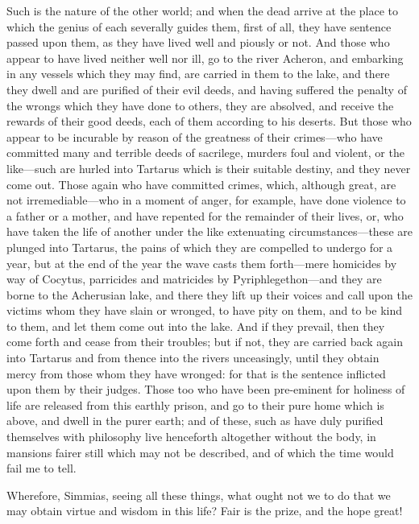 \documentclass[11pt,letter]{article}
\begin{document}
\par  Such is the nature of the other world; and when the dead arrive at the place to which the genius of each severally guides them, first of all, they have sentence passed upon them, as they have lived well and piously or not. And those who appear to have lived neither well nor ill, go to the river Acheron, and embarking in any vessels which they may find, are carried in them to the lake, and there they dwell and are purified of their evil deeds, and having suffered the penalty of the wrongs which they have done to others, they are absolved, and receive the rewards of their good deeds, each of them according to his deserts. But those who appear to be incurable by reason of the greatness of their crimes—who have committed many and terrible deeds of sacrilege, murders foul and violent, or the like—such are hurled into Tartarus which is their suitable destiny, and they never come out. Those again who have committed crimes, which, although great, are not irremediable—who in a moment of anger, for example, have done violence to a father or a mother, and have repented for the remainder of their lives, or, who have taken the life of another under the like extenuating circumstances—these are plunged into Tartarus, the pains of which they are compelled to undergo for a year, but at the end of the year the wave casts them forth—mere homicides by way of Cocytus, parricides and matricides by Pyriphlegethon—and they are borne to the Acherusian lake, and there they lift up their voices and call upon the victims whom they have slain or wronged, to have pity on them, and to be kind to them, and let them come out into the lake. And if they prevail, then they come forth and cease from their troubles; but if not, they are carried back again into Tartarus and from thence into the rivers unceasingly, until they obtain mercy from those whom they have wronged: for that is the sentence inflicted upon them by their judges. Those too who have been pre-eminent for holiness of life are released from this earthly prison, and go to their pure home which is above, and dwell in the purer earth; and of these, such as have duly purified themselves with philosophy live henceforth altogether without the body, in mansions fairer still which may not be described, and of which the time would fail me to tell.

\par  Wherefore, Simmias, seeing all these things, what ought not we to do that we may obtain virtue and wisdom in this life? Fair is the prize, and the hope great!
\end{document}
